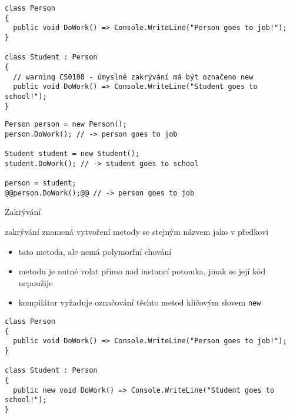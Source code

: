 \begin{frame}[fragile]
\begin{noblock}
\begin{lstlisting}[basicstyle=\small]
class Person
{
  public void DoWork() => Console.WriteLine("Person goes to job!");
}

class Student : Person
{
  // warning CS0108 - úmyslné zakrývání má být označeno new
  public void DoWork() => Console.WriteLine("Student goes to school!");
}
\end{lstlisting}
\end{noblock}

\begin{yesblock}
\begin{lstlisting}[basicstyle=\small]
Person person = new Person();
person.DoWork(); // -> person goes to job

Student student = new Student();
student.DoWork(); // -> student goes to school

person = student;
@@person.DoWork();@@ // -> person goes to job 
\end{lstlisting}
\end{yesblock}
\end{frame}



\begin{frame}[fragile]
\begin{bitemize}{Zakrývání}
\item zakrývání znamená vytvoření metody se stejným názvem jako v předkovi
\begin{itemize}
\item tato metoda, ale nemá polymorfní chování
\item metodu je nutné volat přímo nad instancí potomka, jinak se její kód nepoužije
\item kompilátor vyžaduje označování těchto metod klíčovým slovem \lstinline|new|
\end{itemize}

\end{bitemize}

\begin{yesblock}
\begin{lstlisting}[basicstyle=\small]
class Person
{
  public void DoWork() => Console.WriteLine("Person goes to job!");
}

class Student : Person
{
  public new void DoWork() => Console.WriteLine("Student goes to school!");
}
\end{lstlisting}
\end{yesblock}
\end{frame}




